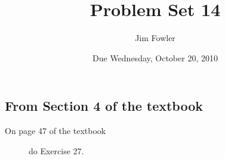 \documentclass[12pt]{handout}
\author{Jim Fowler}
\title{Problem Set 14}
\date{Due Wednesday, October 20, 2010}
\begin{document}
\maketitle










\subsection*{From Section 4 of the textbook}



\begin{description}

\item[On page 47 of the textbook] do Exercise 27.

\end{description}
\end{document}
